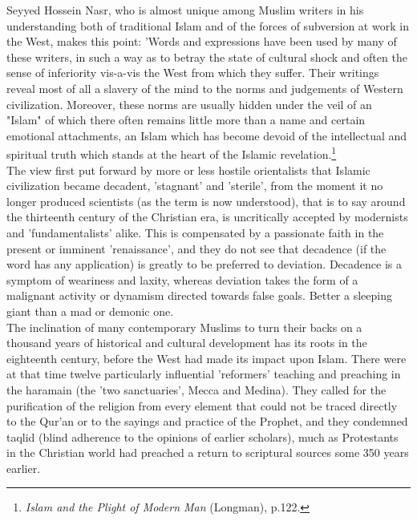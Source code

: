 \documentclass[11pt, b5paper, twoside]{book}
\begin{document}
Seyyed Hossein Nasr, who is almost unique among Muslim writers in his understanding both of traditional Islam and of the forces of subversion at work in the West, makes this point: 'Words and expressions have been used by many of these writers, in such a way as to betray the state of cultural shock and often the sense of inferiority vis-a-vis the West from which they suffer. Their writings reveal most of all a slavery of the mind to the norms and judgements of Western civilization. Moreover, these norms are usually hidden under the veil of an "Islam" of which there often remains little more than a name and certain emotional attachments, an Islam which has become devoid of the intellectual and spiritual truth which stands at the heart of the Islamic revelation.\footnote{\emph{Islam and the Plight of Modern Man} (Longman), p.122.}\\


The view first put forward by more or less hostile orientalists that Islamic civilization became decadent, 'stagnant' and 'sterile', from the moment it no longer produced scientists (as the term is now understood), that is to say around the thirteenth century of the Christian era, is uncritically accepted by modernists and 'fundamentalists' alike. This is compensated by a passionate faith in the present or imminent 'renaissance', and they do not see that decadence (if the word has any application) is greatly to be preferred to deviation. Decadence is a symptom of weariness and laxity, whereas deviation takes the form of a malignant activity or dynamism directed towards false goals. Better a sleeping giant than a mad or demonic one. \\

The inclination of many contemporary Muslims to turn their backs on a thousand years of historical and cultural development has its roots in the eighteenth century, before the West had made its impact upon Islam. There were at that time twelve particularly influential 'reformers' teaching and preaching in the haramain (the 'two sanctuaries', Mecca and Medina). They called for the purification of the religion from every element that could not be traced directly to the Qur'an or to the sayings and practice of the Prophet, and they condemned taqlid (blind adherence to the opinions of earlier scholars), much as Protestants in the Christian world had preached a return to scriptural sources some 350 years earlier. \\
\end{document}
